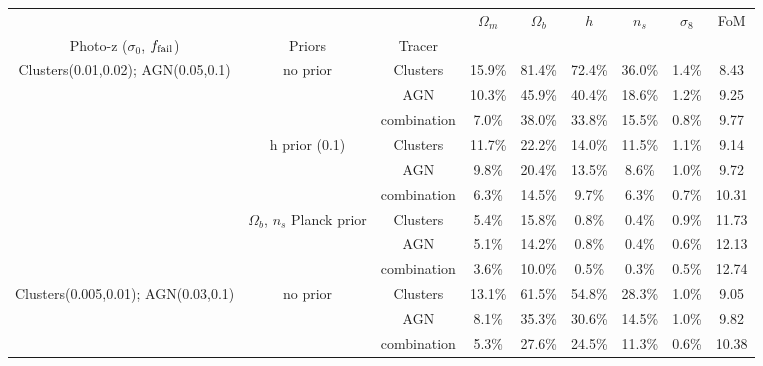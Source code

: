 \begin{tabular}{c|c|c|ccccc|c}
\toprule
                                    &                                &             & $\Omega_m$ & $\Omega_b$ &     $h$ &   $n_s$ & $\sigma_8$ &    FoM \\
Photo-z ($\sigma_0$, $f_{\rm fail}$) & Priors & Tracer &            &            &         &         &            &        \\
\midrule
Clusters(0.01,0.02); AGN(0.05,0.1)  & no prior & Clusters &     15.9\% &     81.4\% &  72.4\% &  36.0\% &      1.4\% &   8.43 \\
                                    &                                & AGN &     10.3\% &     45.9\% &  40.4\% &  18.6\% &      1.2\% &   9.25 \\
                                    &                                & combination &      7.0\% &     38.0\% &  33.8\% &  15.5\% &      0.8\% &   9.77 \\
                                    & h prior (0.1) & Clusters &     11.7\% &     22.2\% &  14.0\% &  11.5\% &      1.1\% &   9.14 \\
                                    &                                & AGN &      9.8\% &     20.4\% &  13.5\% &   8.6\% &      1.0\% &   9.72 \\
                                    &                                & combination &      6.3\% &     14.5\% &   9.7\% &   6.3\% &      0.7\% &  10.31 \\
                                    & $\Omega_b$, $n_s$ Planck prior & Clusters &      5.4\% &     15.8\% &   0.8\% &   0.4\% &      0.9\% &  11.73 \\
                                    &                                & AGN &      5.1\% &     14.2\% &   0.8\% &   0.4\% &      0.6\% &  12.13 \\
                                    &                                & combination &      3.6\% &     10.0\% &   0.5\% &   0.3\% &      0.5\% &  12.74 \\
Clusters(0.005,0.01); AGN(0.03,0.1) & no prior & Clusters &     13.1\% &     61.5\% &  54.8\% &  28.3\% &      1.0\% &   9.05 \\
                                    &                                & AGN &      8.1\% &     35.3\% &  30.6\% &  14.5\% &      1.0\% &   9.82 \\
                                    &                                & combination &      5.3\% &     27.6\% &  24.5\% &  11.3\% &      0.6\% &  10.38 \\

\end{tabular}
